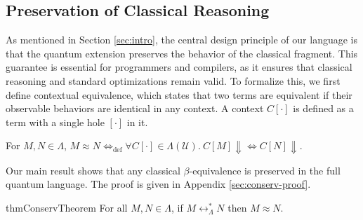 \subsection{Preservation of Classical Reasoning}
As mentioned in Section \ref{sec:intro}, the central design principle of our language is that the quantum extension preserves the behavior of the classical fragment.
This guarantee is essential for programmers and compilers, as it ensures that classical reasoning and standard optimizations remain valid.
To formalize this, we first define contextual equivalence, which states that two terms are equivalent if their observable behaviors are identical in any context.
A context $C[\cdot]$ is defined as a term with a single hole $[\cdot]$ in it.
\begin{dfn} \label{def:contextual-equiv}
  For $M, N \in \Lambda$, $M\approx N \Leftrightarrow_\mathrm{def} \forall C[\cdot]\in\Lambda(\mathcal{U}).\ C[M] \Downarrow \Leftrightarrow C[N] \Downarrow$.
\end{dfn}

Our main result shows that any classical $\beta$-equivalence is preserved in the full quantum language.
The proof is given in Appendix \ref{sec:conserv-proof}.
\begin{restatable}{thm}{ConservTheorem} \label{thm:conservativity}
  For all $M, N \in \Lambda$, if $M \longleftrightarrow^*_\Lambda N$ then $M \approx N$.
\end{restatable}

